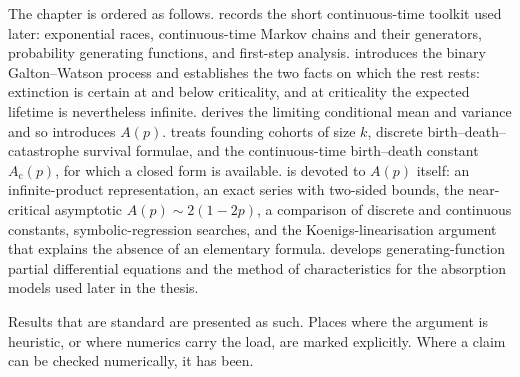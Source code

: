 The chapter is ordered as follows.  records the short continuous-time
toolkit used later: exponential races, continuous-time Markov chains and their
generators, probability generating functions, and first-step analysis.
 introduces the binary Galton--Watson process and establishes the two
facts on which the rest rests: extinction is certain at and below criticality, and at
criticality the expected lifetime is nevertheless infinite.  derives the
limiting conditional mean and variance and so introduces $A(p)$. 
treats founding cohorts of size $k$, discrete birth--death--catastrophe survival
formulae, and the continuous-time birth--death constant $A_{\mathrm{c}}(p)$, for which a
closed form is available.  is devoted to $A(p)$ itself: an infinite-product
representation, an exact series with two-sided bounds, the near-critical asymptotic
$A(p)\sim 2(1-2p)$, a comparison of discrete and continuous constants, symbolic-regression
searches, and the Koenigs-linearisation argument that explains the absence of an
elementary formula.  develops generating-function partial differential
equations and the method of characteristics for the absorption models used later in the
thesis.

Results that are standard are presented as such. Places where the argument is heuristic,
or where numerics carry the load, are marked explicitly. Where a claim can be checked
numerically, it has been.
